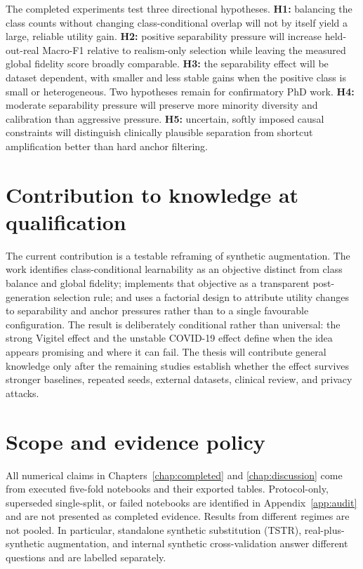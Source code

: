The completed experiments test three directional hypotheses. \textbf{H1:} balancing the class counts without changing class-conditional overlap will not by itself yield a large, reliable utility gain. \textbf{H2:} positive separability pressure will increase held-out-real Macro-F1 relative to realism-only selection while leaving the measured global fidelity score broadly comparable. \textbf{H3:} the separability effect will be dataset dependent, with smaller and less stable gains when the positive class is small or heterogeneous. Two hypotheses remain for confirmatory PhD work. \textbf{H4:} moderate separability pressure will preserve more minority diversity and calibration than aggressive pressure. \textbf{H5:} uncertain, softly imposed causal constraints will distinguish clinically plausible separation from shortcut amplification better than hard anchor filtering.

\section{Contribution to knowledge at qualification}

The current contribution is a testable reframing of synthetic augmentation. The work identifies class-conditional learnability as an objective distinct from class balance and global fidelity; implements that objective as a transparent post-generation selection rule; and uses a factorial design to attribute utility changes to separability and anchor pressures rather than to a single favourable configuration. The result is deliberately conditional rather than universal: the strong Vigitel effect and the unstable COVID-19 effect define when the idea appears promising and where it can fail. The thesis will contribute general knowledge only after the remaining studies establish whether the effect survives stronger baselines, repeated seeds, external datasets, clinical review, and privacy attacks.

\section{Scope and evidence policy}

All numerical claims in Chapters~\ref{chap:completed} and \ref{chap:discussion} come from executed five-fold notebooks and their exported tables. Protocol-only, superseded single-split, or failed notebooks are identified in Appendix~\ref{app:audit} and are not presented as completed evidence. Results from different regimes are not pooled. In particular, standalone synthetic substitution (TSTR), real-plus-synthetic augmentation, and internal synthetic cross-validation answer different questions and are labelled separately.

